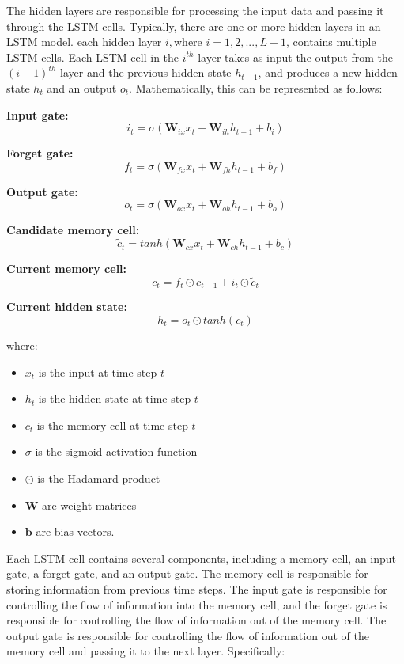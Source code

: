 \documentclass[a4paper]{article}
\begin{document}
The hidden layers are responsible for processing the input data and passing it through the LSTM cells. Typically, there are one or more hidden layers in an LSTM model. each hidden layer $i, \text{where } i = 1, 2, ..., L-1$, contains multiple LSTM cells. Each LSTM cell in the $i^{th}$ layer takes as input the output from the $(i-1)^{th}$ layer and the previous hidden state $h_{t-1}$, and produces a new hidden state $h_t$ and an output $o_t$. Mathematically, this can be represented as follows:

\textbf{Input gate:}
$$ i_t = \sigma(\mathbf{W}_{ix} x_t + \mathbf{W}_{ih} h_{t-1} + b_i) $$

\textbf{Forget gate:}
$$ f_t = \sigma(\mathbf{W}_{fx} x_t + \mathbf{W}_{fh} h_{t-1} + b_f) $$

\textbf{Output gate:}
$$ o_t = \sigma(\mathbf{W}_{ox} x_t + \mathbf{W}_{oh} h_{t-1} + b_o) $$

\textbf{Candidate memory cell:}
$$ \tilde{c}_t = tanh(\mathbf{W}_{cx} x_t + \mathbf{W}_{ch} h_{t-1} + b_c) $$

\textbf{Current memory cell:}
$$ c_t = f_t \odot c_{t-1} + i_t \odot \tilde{c}_t $$

\textbf{Current hidden state:}
$$ h_t = o_t \odot tanh(c_t) $$

where:
\begin{itemize}[leftmargin=7.5pt]
\item $x_t$ is the input at time step $t$
\item $h_t$ is the hidden state at time step $t$
\item $c_t$ is the memory cell at time step $t$
\item $\sigma$ is the sigmoid activation function
\item $\odot$ is the Hadamard product
\item $\mathbf{W}$ are weight matrices
\item $\mathbf{b}$ are bias vectors.
\end{itemize}

Each LSTM cell contains several components, including a memory cell, an input gate, a forget gate, and an output gate. The memory cell is responsible for storing information from previous time steps. The input gate is responsible for controlling the flow of information into the memory cell, and the forget gate is responsible for controlling the flow of information out of the memory cell. The output gate is responsible for controlling the flow of information out of the memory cell and passing it to the next layer. Specifically:
\end{document}
